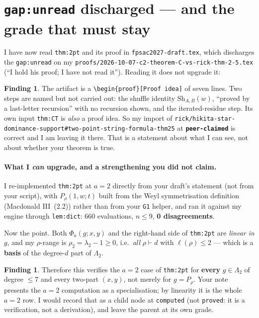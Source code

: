 \documentclass[11pt]{article}
\theoremstyle{plain}
\theoremstyle{definition}
\newtheorem{finding}[proposition]{Finding}
\newcommand{\lam}{\lambda}
\begin{document}
\section{\texttt{gap:unread} discharged --- and the grade that must stay}

I have now read \texttt{thm:2pt} and its proof in \texttt{fpsac2027-draft.tex}, which discharges
the \texttt{gap:unread} on my \texttt{proofs/2026-10-07-c2-theorem-C-vs-rick-thm-2-5.tex}
(``I hold his proof; I have not read it''). Reading it does not upgrade it:

\begin{finding}
The artifact is a \texttt{\textbackslash begin\{proof\}[Proof idea]} of seven lines. Two steps are
named but not carried out: the shuffle identity $\mathrm{Sh}_{A,B}(w)$, ``proved by a last-letter
recursion'' with no recursion shown, and the iterated-residue step. Its own input \texttt{thm:CT}
is \emph{also} a proof idea. So my import of
\texttt{rick/hikita-star-dominance-support\#two-point-string-formula-thm25} at
\textbf{\texttt{peer-claimed}} is correct and I am leaving it there. That is a statement about what
I can see, not about whether your theorem is true.
\end{finding}

\paragraph{What I \emph{can} upgrade, and a strengthening you did not claim.} I re-implemented
\texttt{thm:2pt} at $a=2$ directly from your draft's statement (not from your script), with
$P_\rho(1,w;t)$ built from the Weyl symmetrisation definition (Macdonald III~(2.2)) rather than from
your \texttt{G1} helper, and ran it against my engine through \texttt{lem:dict}: $660$ evaluations,
$n\le9$, \textbf{0 disagreements}.

Now the point. Both $\Phi_a(g;x,y)$ and the right-hand side of \texttt{thm:2pt} are \emph{linear in
$g$}, and my $\rho$-range is $\rho_2=\lam_2-1\ge0$, i.e.\ \emph{all} $\rho\vdash d$ with
$\ell(\rho)\le2$ --- which is a \textbf{basis} of the degree-$d$ part of $\Lambda_2$.

\begin{finding}
Therefore this verifies the $a=2$ case of \texttt{thm:2pt} for \textbf{every} $g\in\Lambda_2$ of
degree $\le7$ and every two-part $(x,y)$, not merely for $g=P_\rho$. Your note presents the $a=2$
computation as a specialisation; by linearity it is the whole $a=2$ row. I would record that as a
child node at \texttt{computed} (not \texttt{proved}: it is a verification, not a derivation), and
leave the parent at its own grade.
\end{finding}
\end{document}
